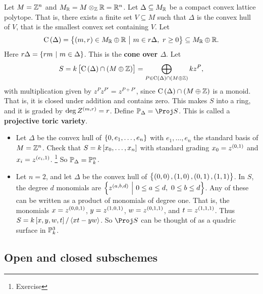 \pagebreak

\begin{example*}
Let $ M = \mathbb{Z}^n $ and $ M_{\mathbb{R}} = M \otimes_{\mathbb{Z}} \mathbb{R} = \mathbb{R}^n $. Let $ \Delta \subseteq M_{\mathbb{R}} $ be a compact convex lattice polytope. That is, there exists a finite set $ V \subseteq M $ such that $ \Delta $ is the convex hull of $ V $, that is the smallest convex set containing $ V $. Let
$$ \C\br{\Delta} = \cbr{\br{m, r} \in M_\RR \oplus \RR \st m \in r\Delta, \ r \ge 0} \subseteq M_\RR \oplus \RR. $$
Here $ r\Delta = \cbr{rm \st m \in \Delta} $. This is the \textbf{cone over $ \Delta $}. Let
$$ S = k\sbr{\C\br{\Delta} \cap \br{M \oplus \ZZ}} = \bigoplus_{P \in \C\br{\Delta} \cap \br{M \oplus \ZZ}} kz^P, $$
with multiplication given by $ z^Pz^{P'} = z^{P + P'} $, since $ \C\br{\Delta} \cap \br{M \oplus \ZZ} $ is a monoid. That is, it is closed under addition and contains zero. This makes $ S $ into a ring, and it is graded by $ \deg Z^{\br{m, r}} = r $. Define $ \PP_\Delta = \Proj S $. This is called a \textbf{projective toric variety}.
\begin{itemize}
\item Let $ \Delta $ be the convex hull of $ \cbr{0, e_1, \dots, e_n} $ with $ e_1, \dots, e_n $ the standard basis of $ M = \mathbb{Z}^n $. Check that $ S = k\sbr{x_0, \dots, x_n} $ with standard grading $ x_0 = z^{\br{0, 1}} $ and $ x_i = z^{\br{e_i, 1}} $. \footnote{Exercise} So $ \mathbb{P}_\Delta = \mathbb{P}_k^n $.
\item Let $ n = 2 $, and let $ \Delta $ be the convex hull of $ \cbr{\br{0, 0}, \br{1, 0}, \br{0, 1}, \br{1, 1}} $. In $ S $, the degree $ d $ monomials are $ \cbr{z^{\br{a, b, d}} \st 0 \le a \le d, \ 0 \le b \le d} $. Any of these can be written as a product of monomials of degree one. That is, the monomials $ x = z^{\br{0, 0, 1}} $, $ y = z^{\br{1, 0, 1}} $, $ w = z^{\br{0, 1, 1}} $, and $ t = z^{\br{1, 1, 1}} $. Thus $ S = k\sbr{x, y, w, t} / \abr{xt - yw} $. So $ \Proj S $ can be thought of as a quadric surface in $ \mathbb{P}_k^3 $.
\end{itemize}
\end{example*}

\subsection{Open and closed subschemes}


